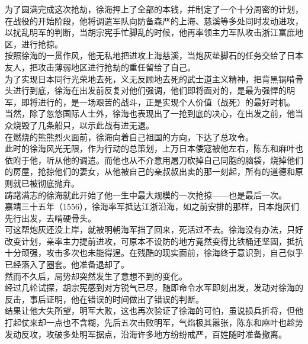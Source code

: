 \begin{multicols}{\theparacolNo}
为了圆满完成这次抢劫，徐海押上了全部的本钱，并制定了一个十分周密的计划，在战役的开始阶段，他将调遣军队向防备森严的上海、慈溪等多处同时发动进攻，以扰乱明军的判断，当胡宗宪手忙脚乱的时候，他再率领主力军队攻击浙江富庶地区，进行抢掠。\\

按照徐海的一贯作风，他无私地把进攻上海慈溪，当炮灰垫脚石的任务交给了日本友人，把攻击薄弱地区进行抢劫的重任留给了自己。\\

为了实现日本同行光荣地去死，义无反顾地去死的武士道主义精神，把背黑锅啃骨头进行到底，徐海在出发前反复对他们强调，他们即将面对的，是最为强悍的明军，即将进行的，是一场艰苦的战斗，正是实现个人价值（战死）的最好时机。\\

当然，除了忽悠国际人士外，徐海也表现出了一抢到底的决心，在出发之前，他当众烧毁了几条船只，以示此战有进无退。\\

在燃烧的熊熊烈火面前，徐海向着自己祖国的方向，下达了总攻令。\\

此时的徐海风光无限，作为行动的总策划，上万日本倭寇被他左右，陈东和麻叶也依附于他，听从他的调遣。而他也从不介意用屠刀砍掉自己同胞的脑袋，烧掉他们的房屋，抢掠他们的妻女，从他被自己的亲叔叔出卖的那一刻起，所有的道德和原则就已被彻底抛弃。\\

踌躇满志的徐海就此开始了他一生中最大规模的一次抢掠——也是最后一次。\\

嘉靖三十五年（1556），徐海率军抵达江浙沿海，如之前安排的那样，日本炮灰们先行出发，去啃硬骨头。\\

可这帮炮灰还没上岸，就被明朝海军挡了回来，死活过不去。徐海没有办法，只好改变计划，亲率主力提前进攻，可原本不设防的地方竟然变得比铁桶还坚固，抵抗十分顽强，攻击多次也未能得逞。在残酷的现实面前，徐海终于意识到，自己似乎已经落入了圈套。他准备退却了。\\

然而不久后，局势却突然发生了意想不到的变化。\\

经过几轮试探，胡宗宪感到对方锐气已尽，随即命令水军即刻出发，发动对徐海的反击，事后证明，他在错误的时间做出了错误的判断。\\

结果让他大失所望，明军大败，这也再次验证了徐海的可怕，虽说损兵折将，但他打起仗来却一点也不含糊，先后五次击败明军，气焰极其嚣张，陈东和麻叶也趁势发动反攻，攻破多处明军据点，沿海许多地方纷纷戒严，百姓随时准备撤离。\\


\end{multicols}
